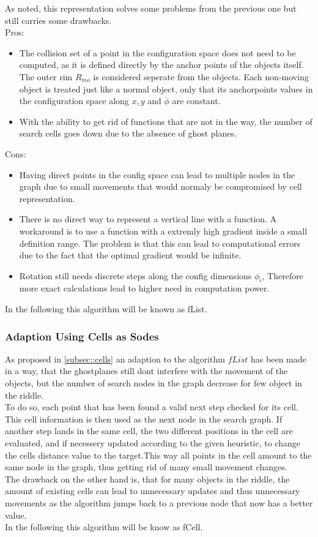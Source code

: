 As noted, this representation solves some problems from the previous one but still carries some drawbacks.\\
Pros:
\begin{itemize}
\item The collision set of a point in the configuration space does not need to be computed, as it is defined directly by the anchor points of the objects itself. The outer rim $R_{mo}$ is considered seperate from the objects. Each non-moving object is treated just like a normal object, only that its anchorpoints values in the configuration space along $x,y$ and $\phi$ are constant.
\item With the ability to get rid of functions that are not in the way, the number of search cells goes down due to the absence of ghost planes.
\end{itemize}
Cons:
\begin{itemize}
\item Having direct points in the config space can lead to multiple nodes in the graph due to small movements that would normaly be compromised by cell representation.
\item There is no direct way to represent a vertical line with a function. A workaround is to use a function with a extremly high gradient inside a small definition range.
The problem is that this can lead to computational errors due to the fact that the optimal gradient would be infinite.
\item Rotation still needs discrete steps along the config dimensions $\phi_i$, Therefore more exact calculations lead to higher need in computation power.
\end{itemize}

In the following this algorithm will be known as fList.

\subsubsection{Adaption Using Cells as Sodes}
As proposed in \ref{subsec::cells} an adaption to the algorithm $fList$ has been made in a way, that the ghostplanes still dont interfere with the movement of the objects, but the number of search nodes in the graph decrease for few object in the riddle.\\
To do so, each point that has been found a valid next step checked for its cell. This cell information is then used as the next node in the search graph. If another step lands in the same cell, the two different positions in the cell are evaluated, and if necessery updated according to the given heuristic, to change the cells distance value to the target.This way all points in the cell amount to the same node in the graph, thus getting rid of many small movement changes.\\
The drawback on the other hand is, that for many objects in the riddle, the amount of existing cells can lead to unnecessary updates and thus unnecessary movements as the algorithm jumps back to a previous node that now has a better value.\\ 
In the following this algorithm will be know as fCell.